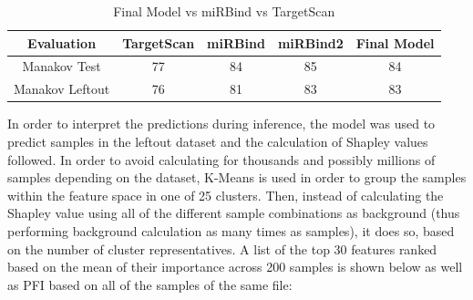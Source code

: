 \documentclass[en,ack]{dimscthesis}
\begin{document}
\begin{table}[H]
    \caption{Final Model vs miRBind vs TargetScan}
    \label{tbl:Model Comparison}
    \begin{center} %
        \begin{tabular}{c|c|c|c|c}
		\textbf{Evaluation} & \textbf{TargetScan} & \textbf{miRBind} & \textbf{miRBind2}& \textbf{Final Model} \\
            \hline
			Manakov Test & 77 & 84 & 85 & 84 \\
			Manakov Leftout & 76 & 81 & 83 & 83 \\
            \hline
        \end{tabular}
    \end{center}
\end{table}




\par In order to interpret the predictions during inference, the model was used to predict samples in the leftout dataset and the calculation of Shapley values followed. In order to avoid calculating for thousands and possibly millions of samples depending on the dataset, K-Means is used in order to group the samples within the feature space in one of 25 clusters. Then, instead of calculating the Shapley value using all of the different sample combinations as background (thus performing background calculation as many times as samples), it does so, based on the number of cluster representatives. A list of the top 30 features ranked based on the mean of their importance across 200 samples is shown below as well as PFI based on all of the samples of the same file:
\end{document}
